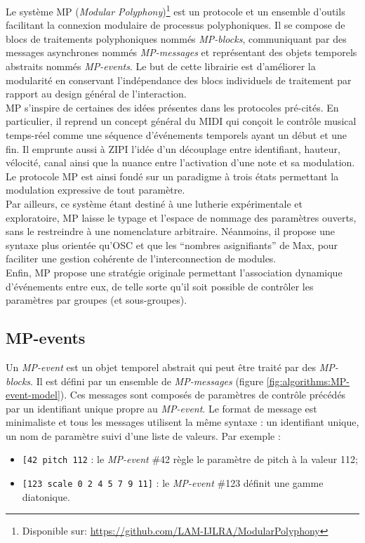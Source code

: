 \noindent Le système MP (\textit{Modular Polyphony})\footnote{Disponible sur: \url{https://github.com/LAM-IJLRA/ModularPolyphony}} est un protocole et un ensemble d'outils facilitant la connexion modulaire de processus polyphoniques. Il se compose de blocs de traitements polyphoniques nommés \textit{MP-blocks}, communiquant par des messages asynchrones nommés \textit{MP-messages} et représentant des objets temporels abstraits nommés \textit{MP-events}. Le but de cette librairie est d'améliorer la modularité en conservant l'indépendance des blocs individuels de traitement par rapport au design général de l'interaction.\\
\indent MP s'inspire de certaines des idées présentes dans les protocoles pré-cités. En particulier, il reprend un concept général du \gls{MIDI} qui conçoit le contrôle musical temps-réel comme une séquence d'événements temporels ayant un début et une fin. Il emprunte aussi à \gls{ZIPI} l'idée d'un découplage entre identifiant, hauteur, vélocité, canal ainsi que la nuance entre l'activation d'une note et sa modulation. Le protocole MP est ainsi fondé sur un paradigme à trois états permettant la modulation expressive de tout paramètre.\\
\indent Par ailleurs, ce système étant destiné à une lutherie expérimentale et exploratoire, MP laisse le typage et l'espace de nommage des paramètres ouverts, sans le restreindre à une nomenclature arbitraire. Néanmoins, il propose une syntaxe plus orientée qu'\gls{OSC} et que les ``nombres asignifiants'' de Max, pour faciliter une gestion cohérente de l'interconnection de modules.\\
\indent Enfin, MP propose une stratégie originale permettant l'association dynamique d'événements entre eux, de telle sorte qu'il soit possible de contrôler les paramètres par groupes (et sous-groupes).\\

\subsection{MP-events}

\noindent Un \textit{MP-event} est un objet temporel abstrait qui peut être traité par des \textit{MP-blocks}. Il est défini par un ensemble de \textit{MP-messages} (figure \ref{fig:algorithms:MP-event-model}). Ces messages sont composés de paramètres de contrôle précédés par un identifiant unique propre au \textit{MP-event}. Le format de message est minimaliste et tous les messages utilisent la même syntaxe : un identifiant unique, un nom de paramètre suivi d'une liste de valeurs. Par exemple :
\vspace{-1em}
\begin{itemize}[noitemsep]
	\item{\verb|[42 pitch 112| : le \textit{MP-event} \#42 règle le paramètre de pitch à la valeur 112;}
	\item{\verb|[123 scale 0 2 4 5 7 9 11]| : le \textit{MP-event} \#123 définit une gamme diatonique.}
\end{itemize}

